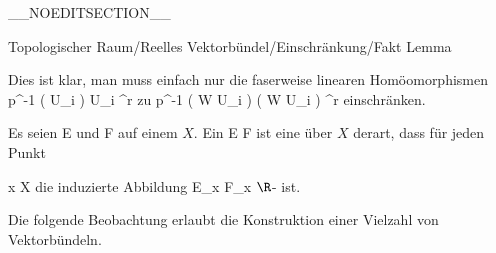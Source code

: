 __NOEDITSECTION__

{Topologischer Raum/Reelles Vektorbündel/Einschränkung/Fakt}
{Lemma}
{}
{

\faktzusatz {}
\faktzusatz {}

}
{

Dies ist klar, man muss einfach nur die faserweise linearen Homöomorphismen
 {p^{-1} \left(  U_i  \right) } { U_i \times \R^r
} {}
zu
 {p^{-1} \left(  W \cap U_i  \right) } { \left(  W \cap U_i  \right)  \times \R^r
} {}
einschränken.

}

{}
{

Es seien
\mathkor {} {E} {und} {F} {}
auf einem
$X$. Ein
\maabb {\varphi} { E } { F
} {}
ist eine
über $X$ derart, dass für jeden Punkt

\mavergleichskette
{\vergleichskette
{ x
}
{ \in }{ X
}
{  }{
}
{    }{
}
{   }{
}
}
{}{}{}
die induzierte Abbildung
 { E_x} {F_x
} {}
$\R$-
ist.

}

Die folgende Beobachtung erlaubt die Konstruktion einer Vielzahl von Vektorbündeln.

